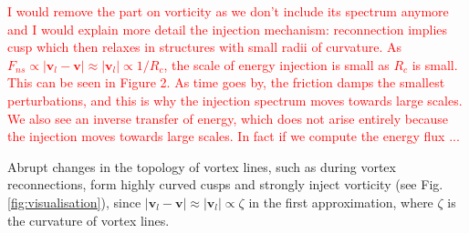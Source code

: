 \documentclass[%
 reprint,
 amsmath,amssymb,
 aps,
 prl,
]{revtex4-2}
\def \v{\mathbf{v}}
\def\red#1{\textcolor{red}{#1}}
\begin{document}
\red{I would remove the part on vorticity as we don't include its spectrum anymore and I would explain more detail the injection mechanism:
reconnection implies cusp which then relaxes in structures with small radii of curvature. As $F_{ns}\propto|\v_l-\v|\approx|\v_l|\propto 1/R_c$, the scale of 
energy injection is small as $R_c$ is small. This can be seen in Figure 2. As time goes by, the friction damps the smallest perturbations, and this is why the injection spectrum moves towards large scales. We also see an inverse transfer of energy, which does not arise entirely because the injection moves towards large scales. In fact if we compute the energy flux ...}

Abrupt changes in the topology of vortex lines, such as during vortex reconnections, form highly curved cusps and strongly inject vorticity (see Fig. \ref{fig:visualisation}), since $|\v_l-\v|\approx|\v_l|\propto\zeta$ in the first approximation, where $\zeta$ is the curvature of vortex lines. 
\end{document}
